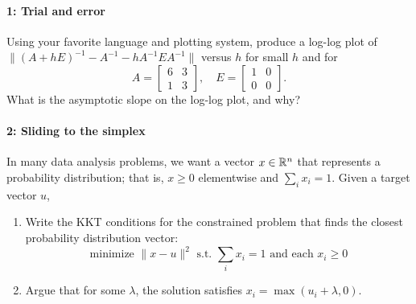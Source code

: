 \documentclass[12pt, leqno]{article} %
\begin{document}

\paragraph*{1: Trial and error}
Using your favorite language and plotting system, produce a log-log
plot of $\|(A+hE)^{-1}-A^{-1}-h A^{-1} E A^{-1}\|$ versus $h$ for
small $h$ and for
\[
  A = \begin{bmatrix} 6 & 3 \\ 1 & 3 \end{bmatrix}, \quad
  E = \begin{bmatrix} 1 & 0 \\ 0 & 0 \end{bmatrix}.
\]
What is the asymptotic slope on the log-log plot, and why?  

\paragraph*{2: Sliding to the simplex}
In many data analysis problems, we want a vector $x \in \mathbb{R}^n$ that
represents a probability distribution; that is, $x \geq 0$ elementwise
and $\sum_i x_i = 1$.  Given a target vector $u$,
\begin{enumerate}
\item Write the KKT conditions for the constrained problem that finds
  the closest probability distribution vector:
\[
  \mbox{minimize } \|x-u\|^2
  \mbox{ s.t. } \sum_i x_i = 1
  \mbox{ and each } x_i \geq 0
\]
\item
  Argue that for some $\lambda$, the solution
  satisfies $x_i = \max(u_i + \lambda, 0)$.
\end{enumerate}
\end{document}
